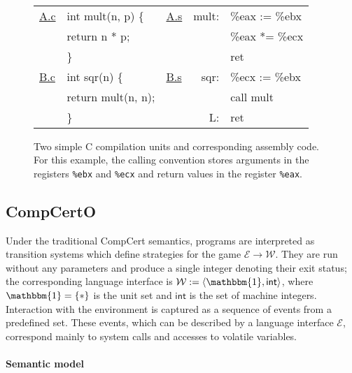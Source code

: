 \documentclass[sigplan,screen]{acmart}
\newcommand{\figsize}{\small}
\newcommand{\kw}[1]{\ensuremath{ \mathsf{#1} }}
\begin{document}
\begin{figure} %
  \figsize
  \tt
  \begin{tabular}{ll lr@{\ }l}
    \hline
    \underline{A.c} & int mult(n, p) \{ &
    \underline{A.s} & mult: & \%eax := \%ebx \\
                    & \quad return n * p; &
                    & & \%eax *= \%ecx \\
                    & \} &
                    & & ret \\
    \hline
    \underline{B.c} & int sqr(n) \{ &
    \underline{B.s} & sqr: & \%ecx := \%ebx \\
                    & \quad return mult(n, n); &
                    & & call mult \\
                    & \} &
                    & L: & ret \\
    \hline
  \end{tabular}
  \caption{Two simple C compilation units and corresponding assembly code.
    For this example,
    the calling convention stores arguments in
    the registers
    \texttt{\%ebx} and \texttt{\%ecx}
    and return values in
    the register
    \texttt{\%eax}.}
  \label{fig:abc}
\end{figure}



\subsection{CompCertO} \label{sec:mainideas:compcerto} %

Under the traditional CompCert semantics,
programs are interpreted as transition systems
which define strategies for the game
$\mathcal{E} \rightarrow \mathcal{W}$.
They are run without any parameters
and produce a single integer denoting their exit status;
the corresponding language interface is
$\mathcal{W} := \langle \mathbbm{1}, \kw{int} \rangle$,
where $\mathbbm{1} = \{ * \}$ is the unit set
and $\kw{int}$ is the set of machine integers.
Interaction with the environment
is captured as a sequence of events from a predefined set.
These events,
which can be described by a language interface $\mathcal{E}$,
correspond mainly to system calls and accesses to volatile variables.

\paragraph{Semantic model} %
\end{document}
